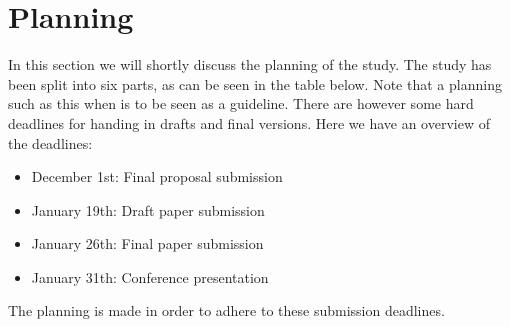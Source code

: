 \section{Planning}
 In this section we will shortly discuss the planning of the study. The study has been split into six parts, as can be seen in the table below. Note that a planning such as this when is to be seen as a guideline. There are however some hard deadlines for handing in drafts and final versions. Here we have an overview of the deadlines:
 \begin{itemize}	
	\item December 1st: Final proposal submission
	\item January 19th: Draft paper submission
	\item January 26th: Final paper submission
	\item January 31th: Conference presentation
\end{itemize}
The planning is made in order to adhere to these submission deadlines.


\begin{figure}[ht]
\noindent{} 
\end{figure}



